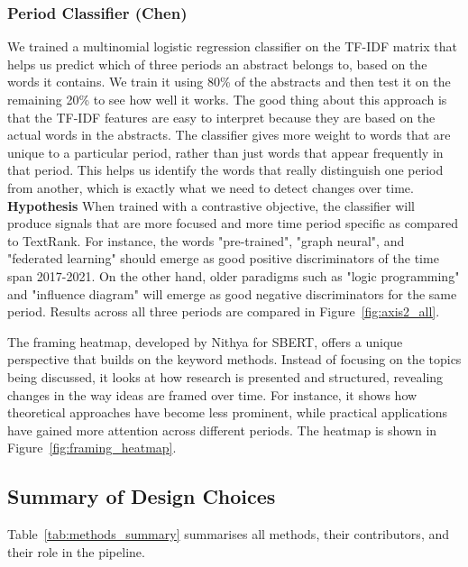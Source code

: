 \documentclass[11pt]{article}
\begin{document}
\subsubsection{Period Classifier (Chen)}
\label{sec:classifier}
We trained a multinomial logistic regression classifier on the TF-IDF matrix that helps us predict which of three periods an abstract belongs to, based on the words it contains. We train it using 80\% of the abstracts and then test it on the remaining 20\% to see how well it works. The good thing about this approach is that the TF-IDF features are easy to interpret because they are based on the actual words in the abstracts. The classifier gives more weight to words that are unique to a particular period, rather than just words that appear frequently in that period. This helps us identify the words that really distinguish one period from another, which is exactly what we need to detect changes over time.
\textbf{Hypothesis} When trained with a contrastive objective, the classifier will produce signals that are more focused and more time period specific as compared to TextRank. For instance, the words "pre-trained", "graph neural", and "federated learning" should emerge as good positive discriminators of the time span 2017-2021. On the other hand, older paradigms such as "logic programming" and "influence diagram" will emerge as good negative discriminators for the same period. Results across all three periods are compared in Figure~\ref{fig:axis2_all}.

The framing heatmap, developed by Nithya for SBERT, offers a unique perspective that builds on the keyword methods. Instead of focusing on the topics being discussed, it looks at how research is presented and structured, revealing changes in the way ideas are framed over time. For instance, it shows how theoretical approaches have become less prominent, while practical applications have gained more attention across different periods. The heatmap is shown in Figure~\ref{fig:framing_heatmap}.

\subsection{Summary of Design Choices}

Table~\ref{tab:methods_summary} summarises all methods, their contributors, and their role in the pipeline.
\end{document}
